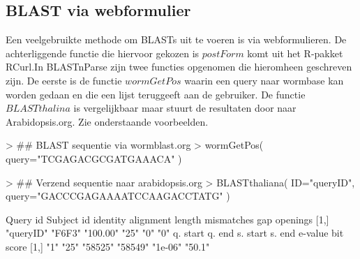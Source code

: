 \documentclass[10pt]{article}
\begin{document}
\subsection*{BLAST via webformulier}
Een veelgebruikte methode om BLASTs uit te voeren is via webformulieren. De achterliggende functie die hiervoor gekozen is $postForm$ komt uit het R-pakket RCurl\cite{RCurl}.In BLASTnParse zijn twee functies opgenomen die hieromheen geschreven zijn. De eerste is de functie $wormGetPos$ waarin een query naar wormbase\cite{Wormbase} kan worden gedaan en die een lijst teruggeeft aan de gebruiker. De functie $BLASTthalina$ is vergelijkbaar maar stuurt de resultaten door naar Arabidopsis.org\cite{Arab}. Zie onderstaande voorbeelden.
\begin{Schunk}
\begin{Sinput}
> ## BLAST sequentie via wormblast.org
> wormGetPos( query="TCGAGACGCGATGAAACA" )
\end{Sinput}
\begin{Sinput}
> ## Verzend sequentie naar arabidopsis.org
> BLASTthaliana( ID="queryID", query="GACCCGAGAAAATCCAAGACCTATG" )
\end{Sinput}
\begin{Soutput}
     Query id  Subject id identity alignment length mismatches gap openings
[1,] "queryID" "F6F3"     "100.00" "25"             "0"        "0"         
     q. start q. end s. start s. end  e-value bit score
[1,] "1"      "25"   "58525"  "58549" "1e-06" "50.1"   
\end{Soutput}
\end{Schunk}
\end{document}
